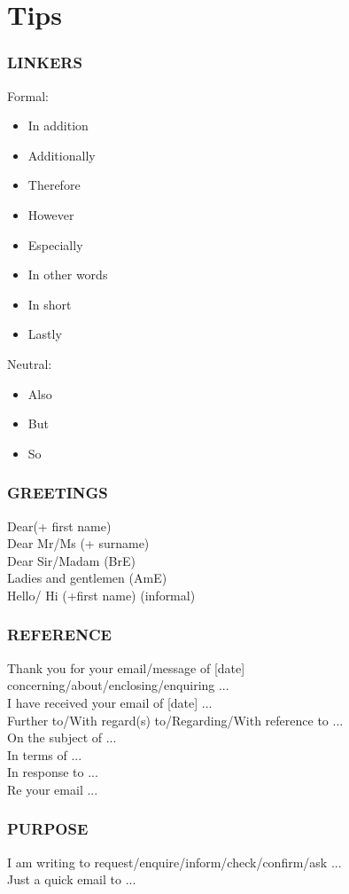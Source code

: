 \section{Tips}
\subsubsection{LINKERS}
Formal:
\begin{itemize}
\item In addition
\item Additionally
\item Therefore
\item However
\item Especially
\item In other words
\item In short
\item Lastly
\end{itemize}
Neutral:
\begin{itemize}
\item Also
\item But
\item So
\end{itemize}
\subsubsection{GREETINGS}
Dear(+ first name)\\
Dear Mr/Ms (+ surname)\\
Dear Sir/Madam (BrE)\\
Ladies and gentlemen (AmE)\\
Hello/ Hi (+first name) (informal)\\
\subsubsection{REFERENCE}
Thank you for your email/message of [date] concerning/about/enclosing/enquiring ...\\
I have received your email of [date] ...\\
Further to/With regard(s) to/Regarding/With reference to ...\\
On the subject of ...\\
In terms of ...\\
In response to ...\\
Re your email ...\\
\subsubsection{PURPOSE}
I am writing to request/enquire/inform/check/confirm/ask ...\\
Just a quick email to ...\\
